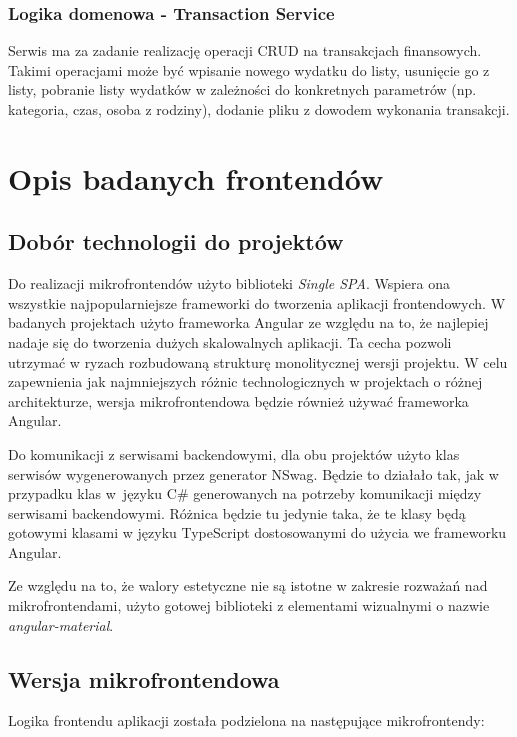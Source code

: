 \documentclass{SGGW-thesis}
\begin{document}
\subsection{Logika domenowa - Transaction Service}
Serwis ma za zadanie realizację operacji CRUD na transakcjach finansowych. Takimi operacjami może być wpisanie nowego wydatku do listy, usunięcie go z listy, pobranie listy wydatków w zależności do konkretnych parametrów (np. kategoria, czas, osoba z rodziny), dodanie pliku z dowodem wykonania transakcji.

\chapter{Opis badanych frontendów}
\section{Dobór technologii do projektów}
Do realizacji mikrofrontendów użyto biblioteki \textit{Single SPA}. Wspiera ona wszystkie najpopularniejsze frameworki do tworzenia aplikacji frontendowych. W badanych projektach użyto frameworka Angular ze względu na to, że najlepiej nadaje się do tworzenia dużych skalowalnych aplikacji. Ta cecha pozwoli utrzymać w ryzach rozbudowaną strukturę monolitycznej wersji projektu. W celu zapewnienia jak najmniejszych różnic technologicznych w projektach o różnej architekturze, wersja mikrofrontendowa będzie również używać frameworka Angular.

Do komunikacji z serwisami backendowymi, dla obu projektów użyto klas serwisów wygenerowanych przez generator NSwag. Będzie to działało tak, jak w przypadku klas w~języku C\# generowanych na potrzeby komunikacji między serwisami backendowymi. Różnica będzie tu jedynie taka, że te klasy będą gotowymi klasami w języku TypeScript dostosowanymi do użycia we frameworku Angular.

Ze względu na to, że walory estetyczne nie są istotne w zakresie rozważań nad mikrofrontendami, użyto gotowej biblioteki z elementami wizualnymi o nazwie \textit{angular-material}.

  \section{Wersja mikrofrontendowa}
  Logika frontendu aplikacji została podzielona na następujące mikrofrontendy:
\end{document}
